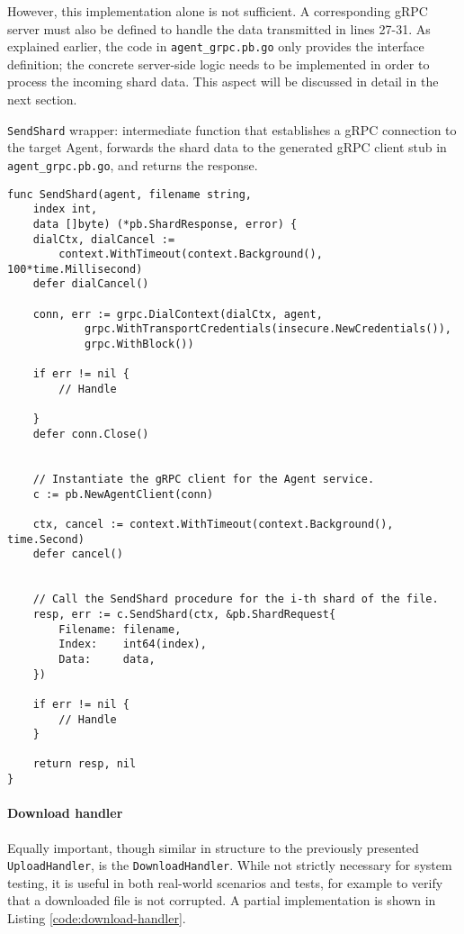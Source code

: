 However, this implementation alone is not sufficient. A corresponding gRPC server must also be defined to handle the data transmitted in lines 27-31. As explained earlier, the code in \texttt{agent\_grpc.pb.go} only provides the interface definition; the concrete server-side logic needs to be implemented in order to process the incoming shard data. This aspect will be discussed in detail in the next section.

\begin{listing}
\caption{\texttt{SendShard} wrapper: intermediate function that establishes a gRPC connection to the target Agent, forwards the shard data to the generated gRPC client stub in \texttt{agent\_grpc.pb.go}, and returns the response.}
\label{code:rpc-send-shard}
\begin{verbatim}
func SendShard(agent, filename string,
    index int, 
    data []byte) (*pb.ShardResponse, error) {
    dialCtx, dialCancel := 
        context.WithTimeout(context.Background(), 100*time.Millisecond)
	defer dialCancel()

    conn, err := grpc.DialContext(dialCtx, agent,
            grpc.WithTransportCredentials(insecure.NewCredentials()),
            grpc.WithBlock())

    if err != nil {
        // Handle
    
    }
    defer conn.Close()

    
    // Instantiate the gRPC client for the Agent service.
    c := pb.NewAgentClient(conn) 

    ctx, cancel := context.WithTimeout(context.Background(), time.Second)
    defer cancel()

    
    // Call the SendShard procedure for the i-th shard of the file.
    resp, err := c.SendShard(ctx, &pb.ShardRequest{
        Filename: filename,
        Index:    int64(index),
        Data:     data,
    })

    if err != nil {
        // Handle
    }

    return resp, nil
}
\end{verbatim}
\end{listing}

\paragraph{Download handler}

Equally important, though similar in structure to the previously presented \texttt{UploadHandler}, is the \texttt{DownloadHandler}. While not strictly necessary for system testing, it is useful in both real-world scenarios and tests, for example to verify that a downloaded file is not corrupted. A partial implementation is shown in Listing \ref{code:download-handler}.

